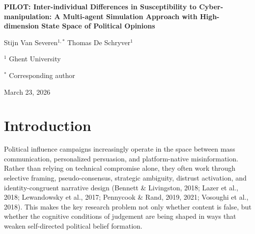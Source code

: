 \documentclass[11pt]{article}
\begin{document}
\begin{center}
{\LARGE\bfseries PILOT: Inter-individual Differences in Susceptibility to Cyber-manipulation: A Multi-agent Simulation Approach with High-dimension State Space of Political Opinions\par}
\vspace{0.8em}
{\large Stijn Van Severen$^{1,*}$ \quad Thomas De Schryver$^1$\par}
\vspace{0.35em}
{\normalsize $^1$ Ghent University\par}
{\normalsize $^*$ Corresponding author\par}
\vspace{0.35em}
{\normalsize March 23, 2026\par}
\end{center}

\begin{abstract}
This pilot examines how inter-individual differences moderate the effectivity of cyber-manipulation on political opinions using an ontology-driven multi-agent simulation pipeline. Run 6 uses an attacked-only profile-panel design in which one fixed misinformation leaf is applied to each pseudoprofile across multiple political-opinion leaves. Attack effectivity is defined as within-profile post-minus-baseline movement, with absolute shift $A_{ik} = |\text{post}_{ik} - \text{baseline}_{ik}|$ as the primary outcome so that issue-specific signed movements do not cancel out. The pilot generated 50 pseudoprofiles, 200 attacked opinion rows, and 4 repeated attacked outcomes per profile. Mean absolute attacked shift was 41.65, mean signed shift was 22.05, mean attack realism was 0.69, and mean post-exposure plausibility was 0.75. The structural model is now a repeated-outcome path SEM in which multiple attacked opinion deltas are regressed on profile moderators simultaneously. To compute a profile-level susceptibility summary without inheriting multicollinearity from a small-sample OLS, a cross-validated ridge aggregation is fit after the run and converted into a post hoc empirical susceptibility index. The pilot should therefore be read as methodological validation and exploratory evidence rather than as claim-ready causal estimation.
\end{abstract}

\section{Introduction}
Political influence campaigns increasingly operate in the space between mass communication, personalized persuasion, and platform-native misinformation. Rather than relying on technical compromise alone, they often work through selective framing, pseudo-consensus, strategic ambiguity, distrust activation, and identity-congruent narrative design (Bennett \& Livingston, 2018; Lazer et al., 2018; Lewandowsky et al., 2017; Pennycook \& Rand, 2019, 2021; Vosoughi et al., 2018). This makes the key research problem not only whether content is false, but whether the cognitive conditions of judgement are being shaped in ways that weaken self-directed political belief formation.
\end{document}
